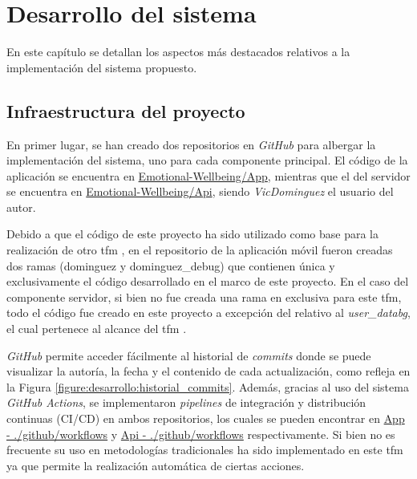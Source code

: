\chapter{Desarrollo del sistema}
    \label{chapter:desarrollo}


    En este capítulo se detallan los aspectos más destacados relativos a la implementación del sistema propuesto.

    \section{Infraestructura del proyecto}

        En primer lugar, se han creado dos repositorios en \textit{GitHub} para albergar la implementación del sistema, uno para cada componente principal. El código de la aplicación se encuentra en \href{https://github.com/Emotional-Wellbeing/App}{Emotional-Wellbeing/App}, mientras que el del servidor se encuentra en \href{https://github.com/Emotional-Wellbeing/Api}{Emotional-Wellbeing/Api}, siendo  \textit{VicDominguez} el usuario del autor.

        Debido a que el código de este proyecto ha sido utilizado como base para la realización de otro \gls{tfm} \cite{marco_pinar_desarrollo_2024}, en el repositorio de la aplicación móvil fueron creadas dos ramas (dominguez y dominguez\_debug) que contienen única y exclusivamente el código desarrollado en el marco de este proyecto. En el caso del componente servidor, si bien no fue creada una rama en exclusiva para este \gls{tfm}, todo el código fue creado en este proyecto a excepción del relativo al \textit{user\_databg}, el cual pertenece al alcance del \gls{tfm} \cite{marco_pinar_desarrollo_2024}.
        
        \textit{GitHub} permite acceder fácilmente al historial de \textit{commits} donde se puede visualizar la autoría, la fecha y el contenido de cada actualización, como refleja en la Figura \ref{figure:desarrollo:historial_commits}. Además, gracias al uso del sistema \textit{GitHub Actions}, se implementaron \textit{pipelines} de integración y distribución continuas (CI/CD) en ambos repositorios, los cuales se pueden encontrar en \href{https://github.com/Emotional-Wellbeing/App/tree/dominguez_debug/.github/workflows}{App - ./github/workflows} y \href{https://github.com/Emotional-Wellbeing/API/tree/main/.github/workflows}{Api - ./github/workflows} respectivamente. Si bien no es frecuente su uso en metodologías tradicionales ha sido implementado en este \gls{tfm} ya que permite la realización automática de ciertas acciones.

